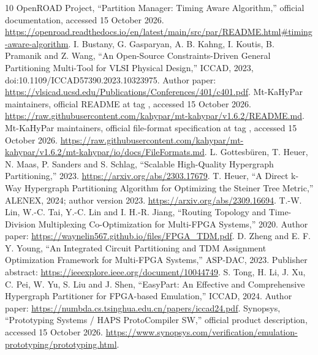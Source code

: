 \documentclass[11pt]{article}
\newcommand{\code}[1]{\texttt{\detokenize{#1}}}
\begin{document}
\begin{thebibliography}{10}
 OpenROAD Project, ``Partition Manager: Timing Aware Algorithm,'' official documentation, accessed 15 October 2026. \url{https://openroad.readthedocs.io/en/latest/main/src/par/README.html#timing-aware-algorithm}.
 I. Bustany, G. Gasparyan, A. B. Kahng, I. Koutis, B. Pramanik and Z. Wang, ``An Open-Source Constraints-Driven General Partitioning Multi-Tool for VLSI Physical Design,'' ICCAD, 2023, doi:10.1109/ICCAD57390.2023.10323975. Author paper: \url{https://vlsicad.ucsd.edu/Publications/Conferences/401/c401.pdf}.
 Mt-KaHyPar maintainers, official README at tag \code{v1.6.2}, accessed 15 October 2026. \url{https://raw.githubusercontent.com/kahypar/mt-kahypar/v1.6.2/README.md}.
 Mt-KaHyPar maintainers, official file-format specification at tag \code{v1.6.2}, accessed 15 October 2026. \url{https://raw.githubusercontent.com/kahypar/mt-kahypar/v1.6.2/mt-kahypar/io/docs/FileFormats.md}.
 L. Gottesb\"uren, T. Heuer, N. Maas, P. Sanders and S. Schlag, ``Scalable High-Quality Hypergraph Partitioning,'' 2023. \url{https://arxiv.org/abs/2303.17679}.
 T. Heuer, ``A Direct k-Way Hypergraph Partitioning Algorithm for Optimizing the Steiner Tree Metric,'' ALENEX, 2024; author version 2023. \url{https://arxiv.org/abs/2309.16694}.
 T.-W. Lin, W.-C. Tai, Y.-C. Lin and I. H.-R. Jiang, ``Routing Topology and Time-Division Multiplexing Co-Optimization for Multi-FPGA Systems,'' 2020. Author paper: \url{https://waynelin567.github.io/files/FPGA_TDM.pdf}.
 D. Zheng and E. F. Y. Young, ``An Integrated Circuit Partitioning and TDM Assignment Optimization Framework for Multi-FPGA Systems,'' ASP-DAC, 2023. Publisher abstract: \url{https://ieeexplore.ieee.org/document/10044749}.
 S. Tong, H. Li, J. Xu, C. Pei, W. Yu, S. Liu and J. Shen, ``EasyPart: An Effective and Comprehensive Hypergraph Partitioner for FPGA-based Emulation,'' ICCAD, 2024. Author paper: \url{https://numbda.cs.tsinghua.edu.cn/papers/iccad24.pdf}.
 Synopsys, ``Prototyping Systems / HAPS ProtoCompiler SW,'' official product description, accessed 15 October 2026. \url{https://www.synopsys.com/verification/emulation-prototyping/prototyping.html}.
\end{thebibliography}
\end{document}
